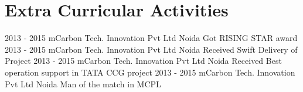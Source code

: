 \documentclass[]{cv-style}
\begin{document}
\section{Extra Curricular Activities}
\begin{entrylist}
\entry
{2013 - 2015}
{mCarbon Tech. Innovation Pvt Ltd}
{Noida}
{Got RISING STAR award}
\entry
{2013 - 2015}
{mCarbon Tech. Innovation Pvt Ltd}
{Noida}
{Received Swift Delivery of Project}
\entry
{2013 - 2015}
{mCarbon Tech. Innovation Pvt Ltd}
{Noida}
{Received Best operation support in TATA CCG project }
\entry
{2013 - 2015}
{mCarbon Tech. Innovation Pvt Ltd}
{Noida}
{Man of the match in MCPL}
\end{entrylist}
\end{document}
